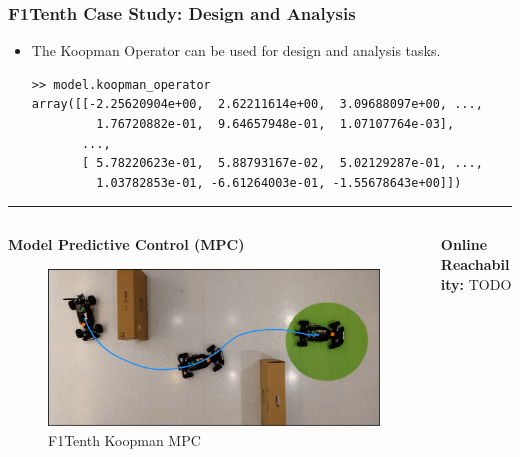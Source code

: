 \documentclass[shortpres,aspectratio=43]{beamer}
\begin{document}
\begin{frame}[fragile]
\frametitle{F1Tenth Case Study: Design and Analysis}
\begin{itemize}
    \item<1-> The Koopman Operator can be used for design and analysis tasks.
	    \vspace{12pt}
\begin{scriptsize}
    \begin{verbatim}
>> model.koopman_operator
array([[-2.25620904e+00,  2.62211614e+00,  3.09688097e+00, ...,
         1.76720882e-01,  9.64657948e-01,  1.07107764e-03],
       ...,
       [ 5.78220623e-01,  5.88793167e-02,  5.02129287e-01, ...,
         1.03782853e-01, -6.61264003e-01, -1.55678643e+00]])
    \end{verbatim}
    \end{scriptsize}
\end{itemize}
\rule{\textwidth}{1pt}
\vspace{-0.25cm}
\begin{columns}
	\begin{column}{0.55\linewidth}
\textbf{Model Predictive Control (MPC)} 
\begin{figure}
	\centering
\includegraphics[width=0.8\linewidth]{./img/F1tenth.eps}
\caption{F1Tenth Koopman MPC}
\end{figure}
	\end{column}
	\begin{column}{0.45\linewidth}
\textbf{Online Reachability:} TODO
\end{column}
\end{columns}
\end{frame}
\end{document}
